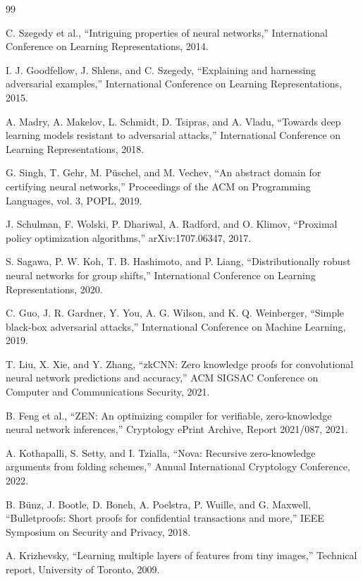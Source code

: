 \documentclass[11pt,a4paper]{report}
\begin{document}
\begin{thebibliography}{99}

C. Szegedy et al.,
``Intriguing properties of neural networks,''
International Conference on Learning Representations, 2014.

I. J. Goodfellow, J. Shlens, and C. Szegedy,
``Explaining and harnessing adversarial examples,''
International Conference on Learning Representations, 2015.

A. Madry, A. Makelov, L. Schmidt, D. Tsipras, and A. Vladu,
``Towards deep learning models resistant to adversarial attacks,''
International Conference on Learning Representations, 2018.

G. Singh, T. Gehr, M. P{\"u}schel, and M. Vechev,
``An abstract domain for certifying neural networks,''
Proceedings of the ACM on Programming Languages, vol. 3, POPL, 2019.

J. Schulman, F. Wolski, P. Dhariwal, A. Radford, and O. Klimov,
``Proximal policy optimization algorithms,''
arXiv:1707.06347, 2017.

S. Sagawa, P. W. Koh, T. B. Hashimoto, and P. Liang,
``Distributionally robust neural networks for group shifts,''
International Conference on Learning Representations, 2020.

C. Guo, J. R. Gardner, Y. You, A. G. Wilson, and K. Q. Weinberger,
``Simple black-box adversarial attacks,''
International Conference on Machine Learning, 2019.

T. Liu, X. Xie, and Y. Zhang,
``zkCNN: Zero knowledge proofs for convolutional neural network predictions and accuracy,''
ACM SIGSAC Conference on Computer and Communications Security, 2021.

B. Feng et al.,
``ZEN: An optimizing compiler for verifiable, zero-knowledge neural network inferences,''
Cryptology ePrint Archive, Report 2021/087, 2021.

A. Kothapalli, S. Setty, and I. Tzialla,
``Nova: Recursive zero-knowledge arguments from folding schemes,''
Annual International Cryptology Conference, 2022.

B. B{\"u}nz, J. Bootle, D. Boneh, A. Poelstra, P. Wuille, and G. Maxwell,
``Bulletproofs: Short proofs for confidential transactions and more,''
IEEE Symposium on Security and Privacy, 2018.

A. Krizhevsky,
``Learning multiple layers of features from tiny images,''
Technical report, University of Toronto, 2009.

\end{thebibliography}
\end{document}

